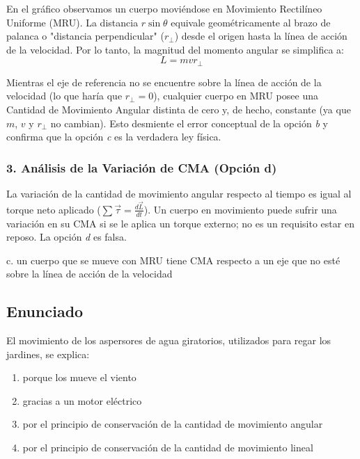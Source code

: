 \documentclass[12pt, a4paper]{article}
\begin{document}
En el gráfico observamos un cuerpo moviéndose en Movimiento Rectilíneo Uniforme (MRU). La distancia $r \sin\theta$ equivale geométricamente al brazo de palanca o "distancia perpendicular" ($r_{\perp}$) desde el origen hasta la línea de acción de la velocidad.
Por lo tanto, la magnitud del momento angular se simplifica a:
$$L = m v r_{\perp}$$

Mientras el eje de referencia no se encuentre sobre la línea de acción de la velocidad (lo que haría que $r_{\perp} = 0$), cualquier cuerpo en MRU posee una Cantidad de Movimiento Angular distinta de cero y, de hecho, constante (ya que $m$, $v$ y $r_{\perp}$ no cambian). 
Esto desmiente el error conceptual de la opción \textit{b} y confirma que la opción \textit{c} es la verdadera ley física.

\subsubsection*{3. Análisis de la Variación de CMA (Opción d)}
La variación de la cantidad de movimiento angular respecto al tiempo es igual al torque neto aplicado ($\sum \vec{\tau} = \frac{d\vec{L}}{dt}$). Un cuerpo en movimiento puede sufrir una variación en su CMA si se le aplica un torque externo; no es un requisito estar en reposo. La opción \textit{d} es falsa.

\begin{tcolorbox}[colback=green!5!white, colframe=green!50!black, title=Respuesta Correcta]
\centering \Large c. un cuerpo que se mueve con MRU tiene CMA respecto a un eje que no esté sobre la línea de acción de la velocidad
\end{tcolorbox}

\newpage

\subsection*{Enunciado}
El movimiento de los aspersores de agua giratorios, utilizados para regar los jardines, se explica:
\begin{enumerate}[label=\alph*.]
    \item porque los mueve el viento
    \item gracias a un motor eléctrico
    \item por el principio de conservación de la cantidad de movimiento angular
    \item por el principio de conservación de la cantidad de movimiento lineal
\end{enumerate}
\end{document}
